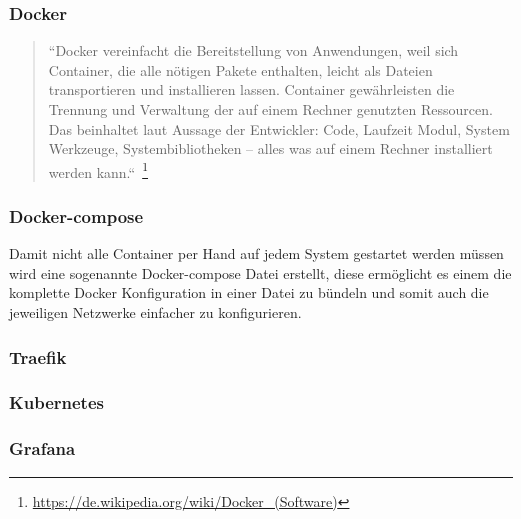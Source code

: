 \subsubsection{Docker} \label{subsubsec:Docker}
\begin{quote}
\begin{minipage}{\linewidth}
\renewcommand\thempfootnote{\arabic{footnote}}
``Docker vereinfacht die Bereitstellung von Anwendungen, weil sich Container,
die alle nötigen Pakete enthalten, leicht als Dateien transportieren und
installieren lassen. Container gewährleisten die Trennung und Verwaltung der
auf einem Rechner genutzten Ressourcen. Das beinhaltet laut Aussage der
Entwickler: Code, Laufzeit Modul, System Werkzeuge, Systembibliotheken – alles
was auf einem Rechner installiert werden kann.``~\footnote{\url{https://de.wikipedia.org/wiki/Docker_(Software)}}
\end{minipage}
\end{quote}

\subsubsection{Docker-compose}
Damit nicht alle Container per Hand auf jedem System gestartet werden müssen
wird eine sogenannte Docker-compose Datei erstellt, diese ermöglicht es einem
die komplette Docker Konfiguration in einer Datei zu bündeln und somit auch die
jeweiligen Netzwerke einfacher zu konfigurieren.

\subsubsection{Traefik} \label{subsubsec:Traefik}
\subsubsection{Kubernetes}
\subsubsection{Grafana}

